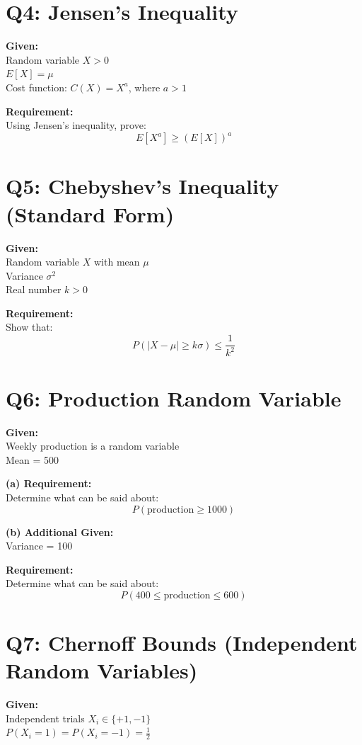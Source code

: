 \documentclass[12pt]{article}
\begin{document}
\section*{Q4: Jensen’s Inequality}

\textbf{Given:} \\
Random variable $X > 0$ \\
$E[X] = \mu$ \\
Cost function: $C(X) = X^a$, where $a > 1$

\textbf{Requirement:} \\
Using Jensen’s inequality, prove:
\[
E[X^a] \geq (E[X])^a
\]

\section*{Q5: Chebyshev’s Inequality (Standard Form)}

\textbf{Given:} \\
Random variable $X$ with mean $\mu$ \\
Variance $\sigma^2$ \\
Real number $k > 0$

\textbf{Requirement:} \\
Show that:
\[
P(|X - \mu| \geq k\sigma) \leq \frac{1}{k^2}
\]

\section*{Q6: Production Random Variable}

\textbf{Given:} \\
Weekly production is a random variable \\
Mean = 500

\textbf{(a) Requirement:} \\
Determine what can be said about:
\[
P(\text{production} \geq 1000)
\]

\textbf{(b) Additional Given:} \\
Variance = 100

\textbf{Requirement:} \\
Determine what can be said about:
\[
P(400 \leq \text{production} \leq 600)
\]

\section*{Q7: Chernoff Bounds (Independent Random Variables)}

\textbf{Given:} \\
Independent trials $X_i \in \{+1, -1\}$ \\
$P(X_i = 1) = P(X_i = -1) = \frac{1}{2}$
\end{document}
